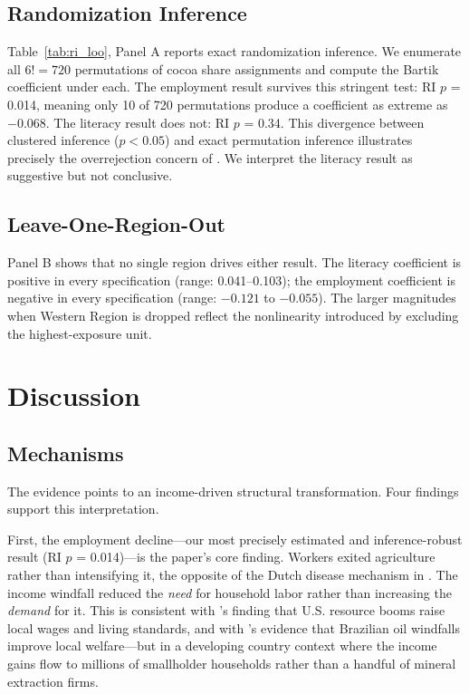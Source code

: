 \documentclass[12pt]{article}
\begin{document}
\subsection{Randomization Inference}
\label{sec:ri}



Table~\ref{tab:ri_loo}, Panel A reports exact randomization inference. We enumerate all $6! = 720$ permutations of cocoa share assignments and compute the Bartik coefficient under each. The employment result survives this stringent test: RI $p$ = 0.014, meaning only 10 of 720 permutations produce a coefficient as extreme as $-0.068$. The literacy result does not: RI $p$ = 0.34. This divergence between clustered inference ($p < 0.05$) and exact permutation inference illustrates precisely the overrejection concern of \citet{cameron2008}. We interpret the literacy result as suggestive but not conclusive.

\subsection{Leave-One-Region-Out}

Panel B shows that no single region drives either result. The literacy coefficient is positive in every specification (range: 0.041--0.103); the employment coefficient is negative in every specification (range: $-0.121$ to $-0.055$). The larger magnitudes when Western Region is dropped reflect the nonlinearity introduced by excluding the highest-exposure unit.


\section{Discussion}

\subsection{Mechanisms}

The evidence points to an income-driven structural transformation. Four findings support this interpretation.

First, the employment decline---our most precisely estimated and inference-robust result (RI $p$ = 0.014)---is the paper's core finding. Workers exited agriculture rather than intensifying it, the opposite of the Dutch disease mechanism in \citet{corden1982}. The income windfall reduced the \textit{need} for household labor rather than increasing the \textit{demand} for it. This is consistent with \citet{allcott2018}'s finding that U.S. resource booms raise local wages and living standards, and with \citet{aragoncaselli2013}'s evidence that Brazilian oil windfalls improve local welfare---but in a developing country context where the income gains flow to millions of smallholder households rather than a handful of mineral extraction firms.
\end{document}

